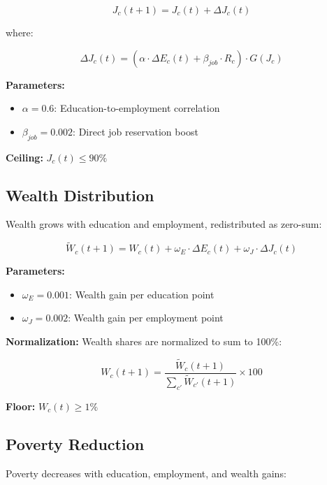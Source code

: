 \documentclass[10pt,twocolumn]{article}
\begin{document}
\begin{equation}
J_c(t+1) = J_c(t) + \Delta J_c(t)
\end{equation}

where:

\begin{equation}
\Delta J_c(t) = \left(\alpha \cdot \Delta E_c(t) + \beta_{job} \cdot R_c\right) \cdot G(J_c)
\end{equation}

\textbf{Parameters:}
\begin{itemize}
    \item $\alpha = 0.6$: Education-to-employment correlation
    \item $\beta_{job} = 0.002$: Direct job reservation boost
\end{itemize}

\textbf{Ceiling:} $J_c(t) \leq 90\%$

\subsection{Wealth Distribution}

Wealth grows with education and employment, redistributed as zero-sum:

\begin{equation}
\tilde{W}_c(t+1) = W_c(t) + \omega_E \cdot \Delta E_c(t) + \omega_J \cdot \Delta J_c(t)
\end{equation}

\textbf{Parameters:}
\begin{itemize}
    \item $\omega_E = 0.001$: Wealth gain per education point
    \item $\omega_J = 0.002$: Wealth gain per employment point
\end{itemize}

\textbf{Normalization:} Wealth shares are normalized to sum to 100\%:

\begin{equation}
W_c(t+1) = \frac{\tilde{W}_c(t+1)}{\sum_{c'} \tilde{W}_{c'}(t+1)} \times 100
\end{equation}

\textbf{Floor:} $W_c(t) \geq 1\%$

\subsection{Poverty Reduction}

Poverty decreases with education, employment, and wealth gains:
\end{document}
